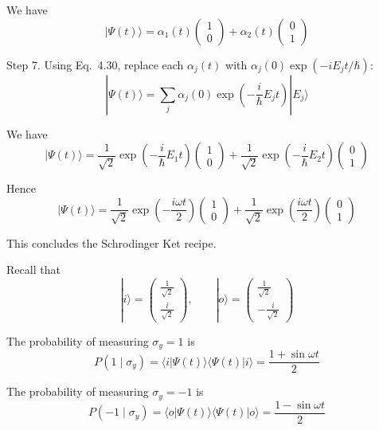 We have
\begin{equation*}
|\Psi(t)\rangle
=\alpha_1(t)\begin{pmatrix}1\\0\end{pmatrix}
+\alpha_2(t)\begin{pmatrix}0\\1\end{pmatrix}
\end{equation*}

Step 7.
Using Eq.~4.30, replace each $\alpha_j(t)$ with
$\alpha_j(0)\exp(-iE_jt/\hbar)$:
\begin{equation*}
|\Psi(t)\rangle=\sum_j\alpha_j(0)
\exp\left(-\frac{i}{\hbar}E_jt\right)
|E_j\rangle
\tag{4.34}
\end{equation*}

We have
\begin{equation*}
|\Psi(t)\rangle
=\frac{1}{\sqrt2}\exp\left(-\frac{i}{\hbar}E_1t\right)\begin{pmatrix}1\\0\end{pmatrix}
+\frac{1}{\sqrt2}\exp\left(-\frac{i}{\hbar}E_2t\right)\begin{pmatrix}0\\1\end{pmatrix}
\end{equation*}

Hence
\begin{equation*}
|\Psi(t)\rangle
=\frac{1}{\sqrt2}\exp\left(-\frac{i\omega t}{2}\right)\begin{pmatrix}1\\0\end{pmatrix}
+\frac{1}{\sqrt2}\exp\left(\frac{i\omega t}{2}\right)\begin{pmatrix}0\\1\end{pmatrix}
\end{equation*}

This concludes the Schrodinger Ket recipe.

\bigskip
Recall that
\begin{equation*}
|i\rangle=\begin{pmatrix}\frac{1}{\sqrt2}\\[1ex]\frac{i}{\sqrt2}\end{pmatrix},
\qquad
|o\rangle=\begin{pmatrix}\frac{1}{\sqrt2}\\[1ex]-\frac{i}{\sqrt2}\end{pmatrix}
\end{equation*}

The probability of measuring $\sigma_y=1$ is
\begin{equation*}
P(1\mid\sigma_y)=\langle i|\Psi(t)\rangle\langle\Psi(t)|i\rangle
=\frac{1+\sin\omega t}{2}
\end{equation*}

The probability of measuring $\sigma_y=-1$ is
\begin{equation*}
P(-1\mid\sigma_y)=\langle o|\Psi(t)\rangle\langle\Psi(t)|o\rangle
=\frac{1-\sin\omega t}{2}
\end{equation*}


